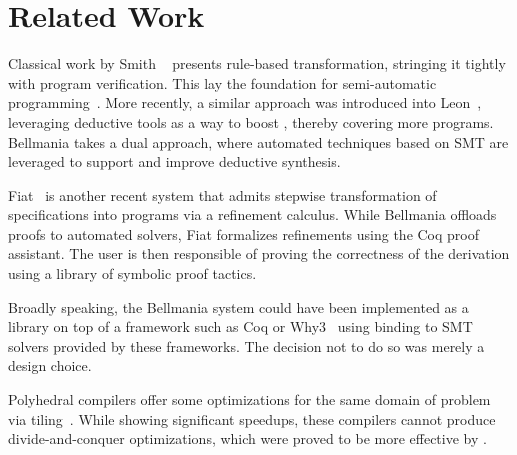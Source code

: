 \section{Related Work}
\label{related}

Classical work by Smith \etal~\cite{AI85/Smith} presents rule-based transformation, stringing it
tightly with program verification. This lay the foundation for semi-automatic programming~\cite{CPS91/Blaine,TSE90/Smith,TPHOLs96/Butler}.
More recently, a similar approach was introduced into Leon~\cite{OOPSLA13/Kneuss}, leveraging deductive
tools as a way to boost {\cegis}, thereby covering more programs. Bellmania takes a dual approach, where
automated techniques based on SMT are leveraged to support and improve deductive synthesis.

Fiat~\cite{POPL15/Delaware} is another recent system that admits stepwise transformation of specifications
into programs via a refinement calculus. While Bellmania offloads proofs to automated solvers,
Fiat formalizes refinements using the Coq proof assistant. The user is then responsible of proving
the correctness of the derivation using a library of symbolic proof tactics.

Broadly speaking, the Bellmania system could have been implemented as a library on top of a framework
such as Coq or Why3~\cite{ESOP13/Filliatre} using binding to SMT solvers provided by these frameworks.
The decision not to do so was merely a design choice.

Polyhedral compilers offer some optimizations for the same domain of problem via tiling~\cite{HPC10/Pouchet,PLDI08/Bondhugula}.
While showing significant speedups, these compilers cannot produce divide-and-conquer optimizations,
which were proved to be more effective by \cite{IPDPS15/Tithi}.

\begin{comment}
Our ``$\big/$'' operator can be compared to the separating disjunction ``$\ast$'' of Separation Logic~\cite{LICS02/Reynolds},
used to frame parts of the dynamic heap (which can be thought of as one large array),
in particular while checking that a program only accesses the parts allocated to it in its precondition.
While $\ast$ has the semantics of an existentially quantified predicate, Bellmania uses type qualifiers
to explicitly specify a formula defining each part. In this sense, it is more closely related to
Region Logic~\cite{ECOOP08/Banerjee}. These formulas make encoding in first-order logic straightforward,
and the use of Liquid Types allows for any number of dimensions and for decidable checking of domain inclusion
and disjointness.
\end{comment}